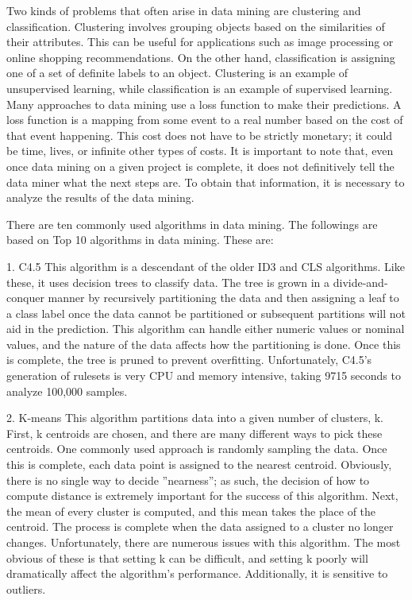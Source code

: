 Two kinds of problems that often arise in data mining are clustering
and classification\cite{editor06}. Clustering involves grouping objects
based on the similarities of their attributes. This can be useful
for applications such as image processing or online shopping
recommendations. On the other hand, classification is assigning
one of a set of definite labels to an object. Clustering is
an example of unsupervised learning, while classification is
an example of supervised learning. Many approaches to data
mining use a loss function to make their predictions. A loss
function is a mapping from some event to a real number based
on the cost of that event happening. This cost does not have
to be strictly monetary; it could be time, lives, or infinite other
types of costs. It is important to note that, even once data
mining on a given project is complete, it does not definitively
tell the data miner what the next steps are. To obtain that
information, it is necessary to analyze the results of the data
mining.

There are ten commonly used algorithms in data mining.
The followings are based on Top 10 algorithms in data mining\cite{editor07}.
These are:

1. C4.5  This algorithm is a descendant of the older ID3 and CLS algorithms.
Like these, it uses decision trees to classify data. The
tree is grown in a divide-and-conquer manner by recursively
partitioning the data and then assigning a leaf to a class label
once the data cannot be partitioned or subsequent partitions
will not aid in the prediction. This algorithm can handle either
numeric values or nominal values, and the nature of the data
affects how the partitioning is done. Once this is complete,
the tree is pruned to prevent overfitting. Unfortunately, C4.5’s
generation of rulesets is very CPU and memory intensive,
taking 9715 seconds to analyze 100,000 samples.

2. K-means  This algorithm partitions data into a given number of clusters,
k. First, k centroids are chosen, and there are many different
ways to pick these centroids. One commonly used approach
is randomly sampling the data. Once this is complete, each
data point is assigned to the nearest centroid. Obviously, there
is no single way to decide ”nearness”; as such, the decision
of how to compute distance is extremely important for the
success of this algorithm. Next, the mean of every cluster
is computed, and this mean takes the place of the centroid.
The process is complete when the data assigned to a cluster
no longer changes. Unfortunately, there are numerous issues
with this algorithm. The most obvious of these is that setting
k can be difficult, and setting k poorly will dramatically affect
the algorithm’s performance. Additionally, it is sensitive to
outliers.

